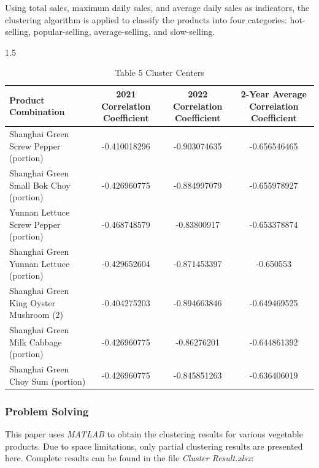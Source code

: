 \documentclass{article}
\begin{document}
	Using total sales, maximum daily sales, and average daily sales as indicators, the clustering algorithm is applied to classify the products into four categories: hot-selling, popular-selling, average-selling, and slow-selling.
	
	\begin{table}[h]
		\centering
		\caption{Table 5 Cluster Centers}
		\renewcommand{\heavyrulewidth}{1.2pt}
		\begin{spacing}{1.5}
			\begin{tabular}{@{}lccc@{}}
				\toprule
				\textbf{Product Combination} & \textbf{2021 Correlation Coefficient} & \textbf{2022 Correlation Coefficient} & \textbf{2-Year Average Correlation Coefficient} \\
				\midrule
				Shanghai Green Screw Pepper (portion) & -0.410018296 & -0.903074635 & -0.656546465 \\
				Shanghai Green Small Bok Choy (portion) & -0.426960775 & -0.884997079 & -0.655978927 \\
				Yunnan Lettuce Screw Pepper (portion) & -0.468748579 & -0.83800917 & -0.653378874 \\
				Shanghai Green Yunnan Lettuce (portion) & -0.429652604 & -0.871453397 & -0.650553 \\
				Shanghai Green King Oyster Mushroom (2) & -0.404275203 & -0.894663846 & -0.649469525 \\
				Shanghai Green Milk Cabbage (portion) & -0.426960775 & -0.86276201 & -0.644861392 \\
				Shanghai Green Choy Sum (portion) & -0.426960775 & -0.845851263 & -0.636406019 \\
				\bottomrule
			\end{tabular}
		\end{spacing}
		\renewcommand{\heavyrulewidth}{0.8pt}
	\end{table}
	
	\subsubsection{Problem Solving}
	
	This paper uses \textit{MATLAB} to obtain the clustering results for various vegetable products. Due to space limitations, only partial clustering results are presented here. Complete results can be found in the file \textit{Cluster Result.xlsx}:
	
\end{document}
